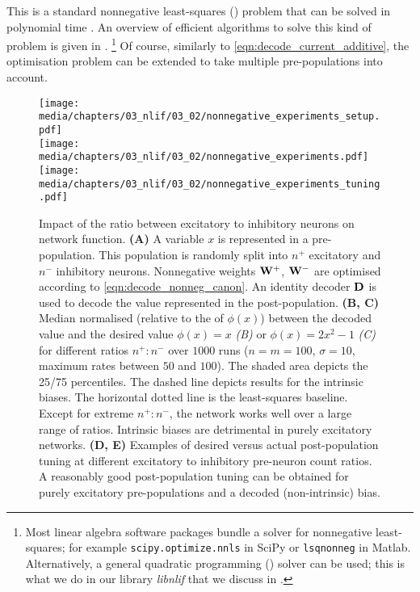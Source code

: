 This is a standard nonnegative least-squares (\NNLS) problem that can be solved in polynomial time \citep[Chapter~23]{lawson1995solving}.
An overview of efficient algorithms to solve this kind of problem is given in \citet{chen2009nonnegativity}.%
\footnote{Most linear algebra software packages bundle a solver for nonnegative least-squares; for example \texttt{scipy.optimize.nnls} in SciPy or \texttt{lsqnonneg} in Matlab. Alternatively, a general quadratic programming (\QP) solver can be used; this is what we do in our library \emph{libnlif} that we discuss in .}
Of course, similarly to \cref{eqn:decode_current_additive}, the optimisation problem can be extended to take multiple pre-populations into account.

\begin{figure}[p]
	\centering
	\texttt{[image: media/chapters/03\_nlif/03\_02/nonnegative\_experiments\_setup.pdf]}\\[0.75cm]	\texttt{[image: media/chapters/03\_nlif/03\_02/nonnegative\_experiments.pdf]}\\[0.75cm]
	\texttt{[image: media/chapters/03\_nlif/03\_02/nonnegative\_experiments\_tuning.pdf]}%
	{\label{fig:nonnegative_experiments_a}}%
	{\label{fig:nonnegative_experiments_b}}%
	{\label{fig:nonnegative_experiments_c}}%
	{\label{fig:nonnegative_experiments_d}}%
	{\label{fig:nonnegative_experiments_e}}%
	\caption[Impact of the ratio between excitatory to inhibitory neurons on network function]{Impact of the ratio between excitatory to inhibitory neurons on network function.
	\textbf{(A)} A variable $x$ is represented in a pre-population. This population is randomly split into $n^+$ excitatory and $n^-$ inhibitory neurons. Nonnegative weights $\mathbf{W}^+$, $\mathbf{W}^-$ are optimised according to \cref{eqn:decode_nonneg_canon}. An identity decoder $\mathbf{D}$ is used to decode the value represented in the post-population.
	\textbf{(B, C)} Median normalised \RMSE (relative to the \RMS of $\phi(x)$) between the decoded value and the desired value $\phi(x) = x$ \emph{(B)} or $\phi(x) = 2x^2 - 1$ \emph{(C)} for different ratios $n^+ \!\! : \! n^-$ over $1000$ runs ($n = m = 100$, $\sigma = 10$, maximum rates between $50$ and $100$). The shaded area depicts the 25/75 percentiles. The dashed line depicts results for the intrinsic biases. The horizontal dotted line is the least-squares baseline.
	Except for extreme $n^+ \!\! : \! n^-$, the network works well over a large range of ratios.
	Intrinsic biases are detrimental in purely excitatory networks.
	\textbf{(D, E)} Examples of desired versus actual post-population tuning at different excitatory to inhibitory pre-neuron count ratios.
	A reasonably good post-population tuning can be obtained for purely excitatory pre-populations and a decoded (non-intrinsic) bias.
	}
	\label{fig:nonnegative_experiments}
\end{figure}

